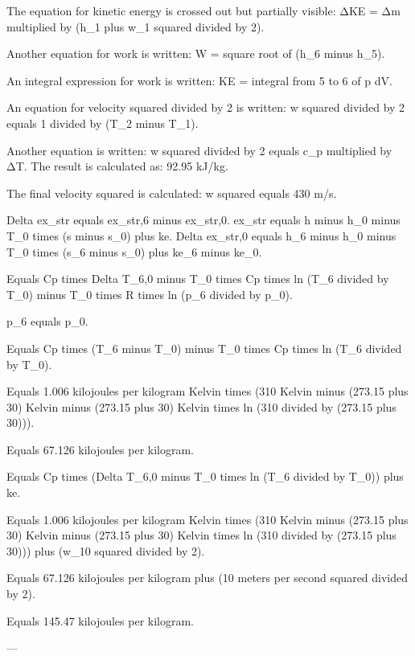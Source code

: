 The equation for kinetic energy is crossed out but partially visible:  
ΔKE = Δm multiplied by (h_1 plus w_1 squared divided by 2).  

Another equation for work is written:  
W = square root of (h_6 minus h_5).  

An integral expression for work is written:  
KE = integral from 5 to 6 of p dV.  

An equation for velocity squared divided by 2 is written:  
w squared divided by 2 equals 1 divided by (T_2 minus T_1).  

Another equation is written:  
w squared divided by 2 equals c_p multiplied by ΔT.  
The result is calculated as:  
92.95 kJ/kg.  

The final velocity squared is calculated:  
w squared equals 430 m/s.

Delta ex_str equals ex_str,6 minus ex_str,0.  
ex_str equals h minus h_0 minus T_0 times (s minus s_0) plus ke.  
Delta ex_str,0 equals h_6 minus h_0 minus T_0 times (s_6 minus s_0) plus ke_6 minus ke_0.  

Equals Cp times Delta T_6,0 minus T_0 times Cp times ln (T_6 divided by T_0) minus T_0 times R times ln (p_6 divided by p_0).  

p_6 equals p_0.  

Equals Cp times (T_6 minus T_0) minus T_0 times Cp times ln (T_6 divided by T_0).  

Equals 1.006 kilojoules per kilogram Kelvin times (310 Kelvin minus (273.15 plus 30) Kelvin minus (273.15 plus 30) Kelvin times ln (310 divided by (273.15 plus 30))).  

Equals 67.126 kilojoules per kilogram.  

Equals Cp times (Delta T_6,0 minus T_0 times ln (T_6 divided by T_0)) plus ke.  

Equals 1.006 kilojoules per kilogram Kelvin times (310 Kelvin minus (273.15 plus 30) Kelvin minus (273.15 plus 30) Kelvin times ln (310 divided by (273.15 plus 30))) plus (w_10 squared divided by 2).  

Equals 67.126 kilojoules per kilogram plus (10 meters per second squared divided by 2).  

Equals 145.47 kilojoules per kilogram.  

---